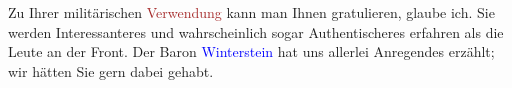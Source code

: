 \pstart
           {\pb}Zu Ihrer militärischen \textcolor{brown}{Verwendung}\ledrightnote{{$\rightarrow$}\emph{\textcolor{brown}{Kriegsarchiv}}} kann man Ihnen gratulieren, glaube ich. Sie
               werden Interessanteres und wahrscheinlich sogar Authentischeres erfahren als die
               Leute an der Front. Der Baron \textcolor{blue}{Winterstein}\ledrightnote{\textcolor{blue}{Alfred von Winterstein}} hat
               uns \label{K_L03774-4v}\label{K_L03774-4}
               allerlei Anregendes erzählt; wir hätten Sie gern dabei gehabt.\pend
           
